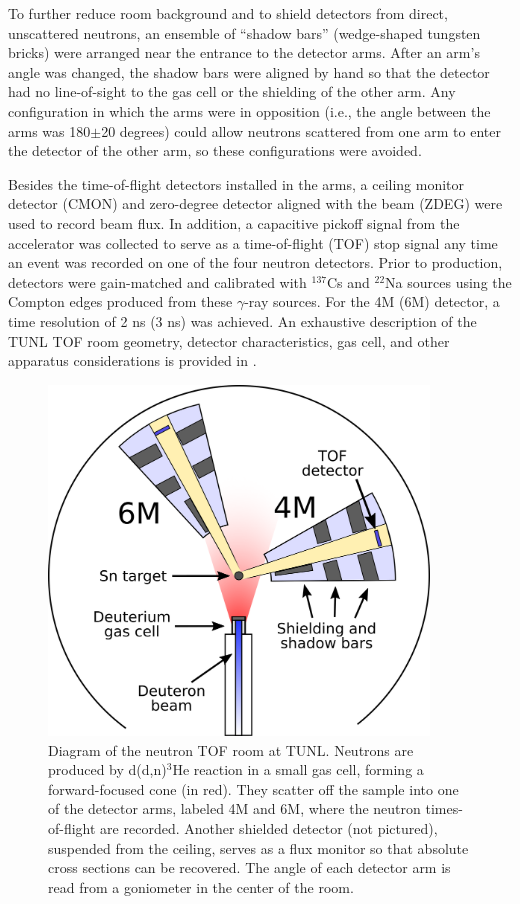 To further reduce room background and to shield detectors from direct,
unscattered neutrons,
an ensemble of ``shadow bars'' (wedge-shaped tungsten bricks)
were arranged near the entrance to the detector arms. After an arm's
angle was changed, the shadow bars were aligned by hand so that the
detector had no line-of-sight to the gas cell or the
shielding of the other arm. Any configuration in which the arms were in opposition (i.e., the
angle between the arms was 180$\pm$20 degrees) could allow neutrons scattered
from one arm to enter the detector of the other arm, so these configurations were avoided.

Besides the time-of-flight detectors installed in the arms, a ceiling monitor
detector (CMON) and zero-degree detector aligned with the beam (ZDEG) were used
to record beam flux. In addition, a capacitive pickoff signal
from the accelerator was collected to serve as a time-of-flight
(TOF) stop signal any time an event was recorded on one of the four neutron
detectors. Prior to production, detectors were gain-matched and calibrated with $^{137}$Cs
and $^{22}$Na sources using the Compton edges produced from these $\gamma$-ray sources. For the
4M (6M) detector, a time resolution of 2 ns (3 ns) was achieved.
An exhaustive description of the TUNL TOF room geometry, detector characteristics,
gas cell, and other apparatus considerations is provided in \cite{GussPhDThesis}.
\begin{figure}[tb]
    \centering
    \includegraphics[width = 0.9\textwidth]{figures/ExperimentalSetupTUNL.png}
    \caption[Diagram of the neutron TOF room at TUNL] 
    {
        Diagram of the neutron TOF room at TUNL. Neutrons are produced by d(d,n)$^{3}$He reaction in
        a small gas cell, forming a forward-focused cone (in red). They scatter
        off the sample into one of the detector arms, labeled 4M and 6M, where the neutron
        times-of-flight are recorded. Another shielded detector (not pictured), suspended from the 
        ceiling, serves as a flux monitor so that absolute cross sections can be
        recovered. The angle of each detector arm is read from a goniometer in
        the center of the room.
    }
    \label{ExperimentalSetupTUNL}
\end{figure}

